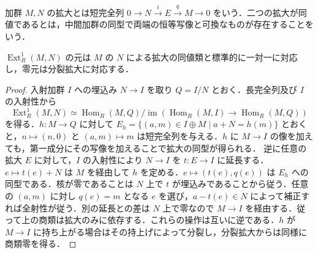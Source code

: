 \begin{defn}[拡大の同値]
加群 $M,N$ の拡大とは短完全列 $0\to N\xrightarrow{i}E\xrightarrow{q}M\to0$ をいう．二つの拡大が同値であるとは，中間加群の同型で両端の恒等写像と可換なものが存在することをいう．
\end{defn}
\begin{prop}[Ext一次と拡大の分類]
$\operatorname{Ext}_R^1(M,N)$ の元は $M$ の $N$ による拡大の同値類と標準的に一対一に対応し，零元は分裂拡大に対応する．
\end{prop}
\begin{proof}
入射加群 $I$ への埋込み $N\to I$ を取り $Q=I/N$ とおく．長完全列及び $I$ の入射性から
\[
\operatorname{Ext}_R^1(M,N)\simeq
\operatorname{Hom}_R(M,Q)/\operatorname{im}(\operatorname{Hom}_R(M,I)\to\operatorname{Hom}_R(M,Q))
\]
を得る．$h:M\to Q$ に対して $E_h=\{(a,m)\in I\oplus M\mid a+N=h(m)\}$ とおくと，$n\mapsto(n,0)$ と $(a,m)\mapsto m$ は短完全列を与える．$h$ に $M\to I$ の像を加えても，第一成分にその写像を加えることで拡大の同型が得られる．
逆に任意の拡大 $E$ に対して，$I$ の入射性により $N\to I$ を $t:E\to I$ に延長する．$e\mapsto t(e)+N$ は $M$ を経由して $h$ を定める．$e\mapsto(t(e),q(e))$ は $E_h$ への同型である．核が零であることは $N$ 上で $t$ が埋込みであることから従う．任意の $(a,m)$ に対し $q(e)=m$ となる $e$ を選び，$a-t(e)\in N$ によって補正すれば全射性が従う．別の延長との差は $N$ 上で零なので $M\to I$ を経由する．従って上の商類は拡大のみに依存する．これらの操作は互いに逆である．$h$ が $M\to I$ に持ち上がる場合はその持上げによって分裂し，分裂拡大からは同様に商類零を得る．
\end{proof}
